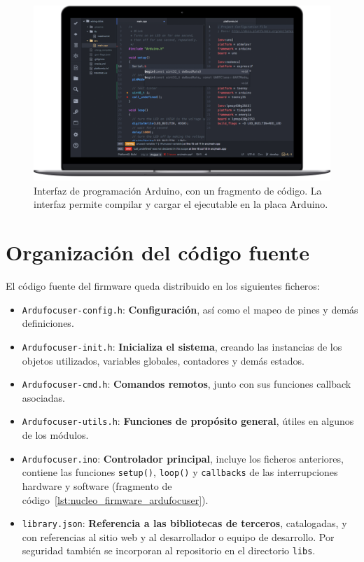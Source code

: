 \begin{figure}
	\centering
	\includegraphics[width=0.9\linewidth]{../images/ide_arduino}
	\caption[IDE Arduino]{Interfaz de programación Arduino, con un fragmento de código. La interfaz permite compilar y cargar el ejecutable en la placa Arduino.}
	\label{fig:ide_arduino}
\end{figure}



\section{Organización del código fuente}

El código fuente del firmware queda distribuido en los siguientes ficheros:

\begin{itemize}
	
\item \texttt{Ardufocuser-config.h}: \textbf{Configuración}, así como el mapeo de pines y demás definiciones. 
\item \texttt{Ardufocuser-init.h}:   \textbf{Inicializa el sistema}, creando las instancias de los objetos utilizados, variables globales, contadores y demás estados.
\item \texttt{Ardufocuser-cmd.h}: \textbf{Comandos remotos}, junto con sus funciones callback asociadas.
\item \texttt{Ardufocuser-utils.h}: \textbf{Funciones de propósito general}, útiles en algunos de los módulos. 
\item \texttt{Ardufocuser.ino}: \textbf{Controlador principal}, incluye los ficheros anteriores, contiene las funciones \texttt{setup()}, \texttt{loop()} y \texttt{callbacks} de las interrupciones hardware y software (fragmento de código~\ref{lst:nucleo_firmware_ardufocuser}).

\item \texttt{library.json}: \textbf{Referencia a las bibliotecas de terceros}, catalogadas, y con referencias al sitio web y al desarrollador o equipo de desarrollo. Por seguridad también se incorporan al repositorio en el directorio \texttt{libs}.  


\end{itemize}

